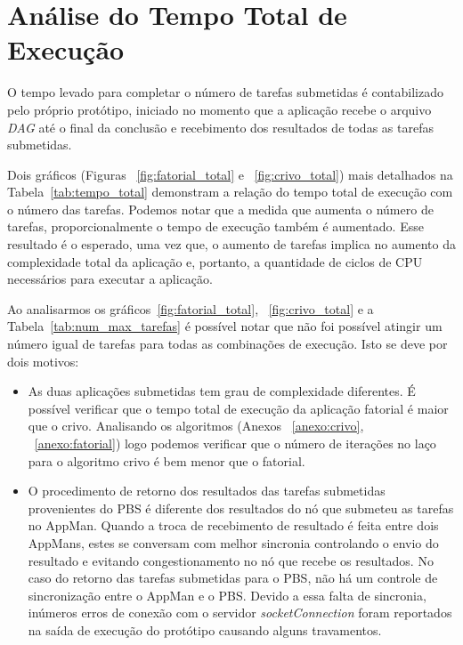 \section{Análise do Tempo Total de Execução}

O tempo levado para completar o número de tarefas submetidas é contabilizado pelo próprio protótipo, iniciado no momento que a aplicação recebe o arquivo \emph{DAG} até o final da conclusão e recebimento dos resultados de todas as tarefas submetidas. 

Dois gráficos (Figuras ~\ref{fig:fatorial_total} e ~\ref{fig:crivo_total}) mais detalhados na Tabela~\ref{tab:tempo_total} demonstram a relação do tempo total de execução com o número das tarefas. Podemos notar que a medida que aumenta o número de tarefas, proporcionalmente o tempo de execução também é aumentado. Esse resultado é o esperado, uma vez que, o aumento de tarefas implica no aumento da complexidade total da aplicação e, portanto, a quantidade de ciclos de CPU necessários para executar a aplicação.

Ao analisarmos os gráficos~\ref{fig:fatorial_total}, ~\ref{fig:crivo_total} e a Tabela~\ref{tab:num_max_tarefas} é possível notar que não foi possível atingir um número igual de tarefas para todas as combinações de execução. Isto se deve por dois motivos:

\begin{itemize}
	\item As duas aplicações submetidas tem grau de complexidade diferentes.
		É possível verificar que o tempo total de execução da aplicação fatorial é maior que o crivo. Analisando os algoritmos (Anexos ~\ref{anexo:crivo}, ~\ref{anexo:fatorial}) logo podemos verificar que o número de iterações no laço para o algoritmo crivo é bem menor que o fatorial.
	\item O procedimento de retorno dos resultados das tarefas submetidas provenientes do PBS é diferente dos resultados do nó que submeteu as tarefas no AppMan. Quando a troca de recebimento de resultado é feita entre dois AppMans, estes se conversam com melhor sincronia controlando o envio do resultado e evitando congestionamento no nó que recebe os resultados. No caso do retorno das tarefas submetidas para o PBS, não há um controle de sincronização entre o AppMan e o PBS. Devido a essa falta de sincronia, inúmeros erros de conexão com o servidor \emph{socketConnection} foram reportados na saída de execução do protótipo causando alguns travamentos.
\end{itemize}


